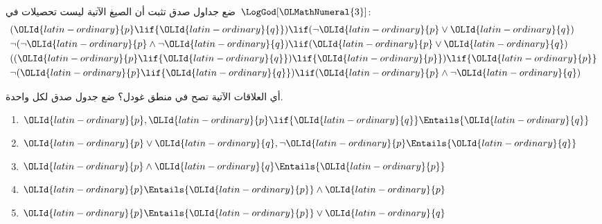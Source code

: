 \documentclass[../../../include/open-logic-section]{subfiles}
\begin{document}
\begin{prob}
  ضع جداول صدق تثبت أن الصيغ الآتية ليست تحصيلات في~$\LogGod[{\OLMathNumeral{3}}]$:
  \begin{align*}
    & ({\OLId{latin-ordinary}{p}} \lif {\OLId{latin-ordinary}{q}}) \lif (\lnot {\OLId{latin-ordinary}{p}} \lor {\OLId{latin-ordinary}{q}}) \\
    & \lnot(\lnot {\OLId{latin-ordinary}{p}} \land \lnot {\OLId{latin-ordinary}{q}}) \lif ({\OLId{latin-ordinary}{p}} \lor {\OLId{latin-ordinary}{q}}) \\
    & (({\OLId{latin-ordinary}{p}} \lif {\OLId{latin-ordinary}{q}}) \lif {\OLId{latin-ordinary}{p}}) \lif {\OLId{latin-ordinary}{p}} \\
    & \lnot({\OLId{latin-ordinary}{p}} \lif {\OLId{latin-ordinary}{q}}) \lif ({\OLId{latin-ordinary}{p}} \land \lnot {\OLId{latin-ordinary}{q}})
  \end{align*}
\end{prob}

\begin{prob}
  أي العلاقات الآتية تصح في منطق غودل؟ ضع جدول صدق لكل واحدة.
  \begin{enumerate}
    \item ${\OLId{latin-ordinary}{p}}, {\OLId{latin-ordinary}{p}} \lif {\OLId{latin-ordinary}{q}} \Entails {\OLId{latin-ordinary}{q}}$
    \item ${\OLId{latin-ordinary}{p}} \lor {\OLId{latin-ordinary}{q}}, \lnot {\OLId{latin-ordinary}{p}} \Entails {\OLId{latin-ordinary}{q}}$
    \item ${\OLId{latin-ordinary}{p}} \land {\OLId{latin-ordinary}{q}} \Entails {\OLId{latin-ordinary}{p}}$
    \item ${\OLId{latin-ordinary}{p}} \Entails {\OLId{latin-ordinary}{p}} \land {\OLId{latin-ordinary}{p}}$
    \item ${\OLId{latin-ordinary}{p}} \Entails {\OLId{latin-ordinary}{p}} \lor {\OLId{latin-ordinary}{q}}$
  \end{enumerate}
\end{prob}
\end{document}
